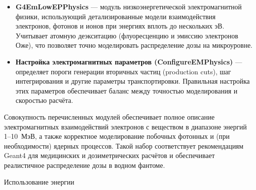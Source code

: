 \documentclass[a4paper,12pt]{article} %
\begin{document}
\begin{itemize}
  \item \textbf{G4EmLowEPPhysics} — модуль низкоэнергетической электромагнитной физики, использующий детализированные модели взаимодействия электронов, фотонов и ионов при энергиях вплоть до нескольких эВ. Учитывает атомную деэкситацию (флуоресценцию и эмиссию электронов Оже), что позволяет точно моделировать распределение дозы на микроуровне.

  \item \textbf{Настройка электромагнитных параметров (ConfigureEMPhysics)} — определяет пороги генерации вторичных частиц (production cuts), шаг интегрирования и другие параметры транспортировки. Правильная настройка этих параметров обеспечивает баланс между точностью моделирования и скоростью расчёта.
\end{itemize}

Совокупность перечисленных модулей обеспечивает полное описание электромагнитных взаимодействий электронов с веществом в диапазоне энергий 1–10~МэВ, а также корректное моделирование побочных фотонных и (при необходимости) ядерных процессов. Такой набор соответствует рекомендациям Geant4 для медицинских и дозиметрических расчётов и обеспечивает реалистичное распределение дозы в водном фантоме.

Использование энергии
\end{document}
